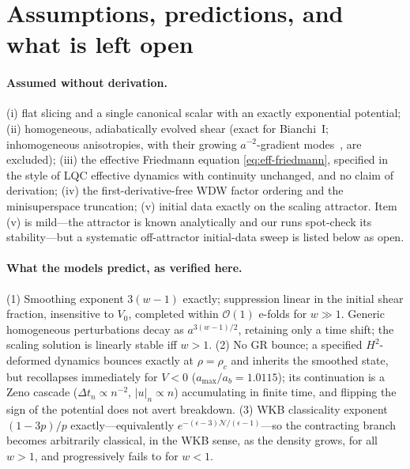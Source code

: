 \documentclass[11pt,a4paper]{article}
\newcommand{\rhoc}{\rho_c}
\begin{document}
\section{Assumptions, predictions, and what is left open}
\label{sec:assumptions}

\paragraph{Assumed without derivation.}
(i) flat slicing and a single canonical scalar with an exactly exponential
potential; (ii) homogeneous, adiabatically evolved shear (exact for
Bianchi~I; inhomogeneous anisotropies, with their growing $a^{-2}$-gradient
modes~\cite{Erickson:2003zm}, are excluded); (iii) the effective Friedmann
equation \eqref{eq:eff-friedmann}, specified in the style of LQC effective
dynamics with continuity unchanged, and no claim of derivation; (iv) the
first-derivative-free WDW factor ordering and the minisuperspace
truncation; (v) initial data exactly on the scaling attractor. Item (v) is
mild---the attractor is known analytically and our runs spot-check its
stability---but a systematic off-attractor initial-data sweep is listed
below as open.

\paragraph{What the models predict, as verified here.}
(1) Smoothing exponent $3(w-1)$ exactly; suppression linear in the initial
shear fraction, insensitive to $V_0$, completed within $\mathcal
O(1)$ e-folds for $w\gg1$. Generic homogeneous perturbations decay as
$a^{3(w-1)/2}$, retaining only a time shift; the scaling solution is
linearly stable iff $w>1$. (2) No GR bounce; a specified $H^2$-deformed
dynamics bounces exactly at $\rho=\rhoc$ and inherits the smoothed state,
but recollapses immediately for $V<0$ ($a_{\max}/a_b=1.0115$); its
continuation is a Zeno cascade ($\Delta t_n\propto n^{-2}$, $|u|_n\propto
n$) accumulating in finite time, and flipping the sign of the potential
does not avert breakdown. (3) WKB classicality exponent $(1-3p)/p$
exactly---equivalently $e^{-(\epsilon-3)\mathcal N/(\epsilon-1)}$---so the
contracting branch becomes arbitrarily classical, in the WKB sense, as the
density grows, for all $w>1$, and progressively fails to for $w<1$.
\end{document}
